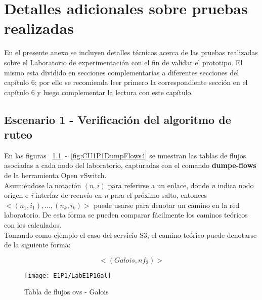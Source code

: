 
\chapter{Detalles adicionales sobre pruebas realizadas}
\label{appendix6}

\ifpdf
    \graphicspath{{Appendix6/Figs/Raster/}{Appendix6/Figs/PDF/}{Appendix6/Figs/}}
\else
    \graphicspath{{Appendix6/Figs/Vector/}{Appendix6/Figs/}}
\fi

En el presente anexo se incluyen detalles t\'ecnicos acerca de las pruebas realizadas sobre el Laboratorio de experimentaci\'on con el fin de validar el prototipo. El mismo esta dividido en secciones complementarias a diferentes secciones del cap\'itulo 6; por ello se recomienda leer primero la correspondiente secci\'on en el cap\'itulo 6 y luego complementar la lectura con este cap\'itulo.

\section{Escenario 1 - Verificación del algoritmo de ruteo}
\label{appendix6.1}
En las figuras ~\ref{fig:CU1P1DumpFlows1}~-~\ref{fig:CU1P1DumpFlows4} se muestran las tablas de flujos asociadas a cada nodo del laboratorio, capturadas con el comando \textbf{dumpe-flows} de la herramienta Open vSwitch.\\

Asumiéndose la notaci\'on $(n, i)$ para referirse a un enlace, donde \textit{n} indica nodo origen e \textit{i} interfaz de reenvío en \textit{n} para el próximo salto, entonces $<(n_1, i_1), \dots, (n_k, i_k)>$ puede usarse para denotar un camino en la red laboratorio. De esta forma se pueden comparar f\'acilmente los caminos te\'oricos con los calculados.\\

Tomando como ejemplo el caso del servicio S3, el camino te\'orico puede denotarse de la siguiente forma:
 
$$<(Galois, nf_2)>$$

\newpage
\begin{figure}[ht!] 
\centering    
\texttt{[image: E1P1/LabE1P1Gal]}
\caption[Tabla de flujos ovs - Galois]{Tabla de flujos ovs - Galois}
\label{fig:CU1P1DumpFlows1}
\end{figure}

